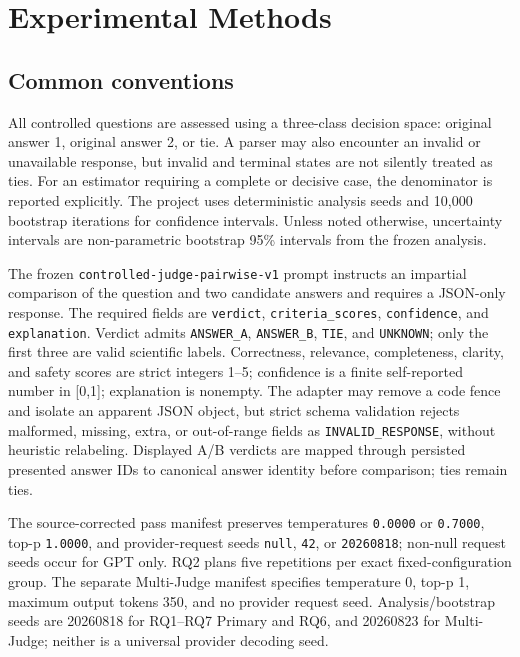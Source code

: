 \chapter{Experimental Methods}
\label{ch:methods}

\section{Common conventions}

All controlled questions are assessed using a three-class decision space: original answer 1, original answer 2, or tie. A parser may also encounter an invalid or unavailable response, but invalid and terminal states are not silently treated as ties. For an estimator requiring a complete or decisive case, the denominator is reported explicitly. The project uses deterministic analysis seeds and 10,000 bootstrap iterations for confidence intervals. Unless noted otherwise, uncertainty intervals are non-parametric bootstrap 95\% intervals from the frozen analysis.

The frozen \texttt{controlled-judge-pairwise-v1} prompt instructs an impartial comparison of the question and two candidate answers and requires a JSON-only response. The required fields are \texttt{verdict}, \texttt{criteria\_scores}, \texttt{confidence}, and \texttt{explanation}. Verdict admits \texttt{ANSWER\_A}, \texttt{ANSWER\_B}, \texttt{TIE}, and \texttt{UNKNOWN}; only the first three are valid scientific labels. Correctness, relevance, completeness, clarity, and safety scores are strict integers 1--5; confidence is a finite self-reported number in [0,1]; explanation is nonempty. The adapter may remove a code fence and isolate an apparent JSON object, but strict schema validation rejects malformed, missing, extra, or out-of-range fields as \texttt{INVALID\_RESPONSE}, without heuristic relabeling. Displayed A/B verdicts are mapped through persisted presented answer IDs to canonical answer identity before comparison; ties remain ties.

The source-corrected pass manifest preserves temperatures \texttt{0.0000} or \texttt{0.7000}, top-p \texttt{1.0000}, and provider-request seeds \texttt{null}, \texttt{42}, or \texttt{20260818}; non-null request seeds occur for GPT only. RQ2 plans five repetitions per exact fixed-configuration group. The separate Multi-Judge manifest specifies temperature 0, top-p 1, maximum output tokens 350, and no provider request seed. Analysis/bootstrap seeds are 20260818 for RQ1--RQ7 Primary and RQ6, and 20260823 for Multi-Judge; neither is a universal provider decoding seed.

